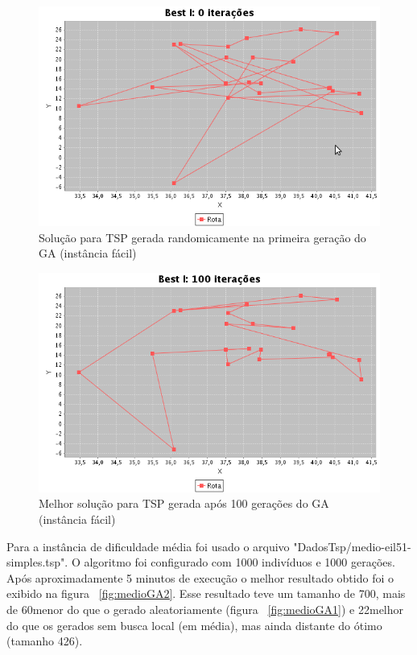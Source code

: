 \documentclass{acm_proc_article-sp}
\begin{document}
\begin{figure}[ht]
 \begin{center}
  \includegraphics[scale=0.4]{imagens/facil_GA1.png} 
  \caption{Solução para TSP gerada randomicamente na primeira geração do GA (instância fácil)}
  \label{fig:facilGA1}
 \end{center}
\end{figure}

\begin{figure}[ht]
 \begin{center}
  \includegraphics[scale=0.4]{imagens/facil_GA2.png} 
  \caption{Melhor solução para TSP gerada após 100 gerações do GA (instância fácil)}
  \label{fig:facilGA2}
 \end{center}
\end{figure}

Para a instância de dificuldade média foi usado o arquivo "DadosTsp/medio-eil51-simples.tsp".  O algoritmo foi configurado com 1000 indivíduos e 1000 gerações. Após aproximadamente 5 minutos  de execução o melhor resultado obtido foi o exibido na figura ~\ref{fig:medioGA2}. Esse resultado teve um tamanho de 700, mais de 60\textdiscount menor do que o gerado aleatoriamente (figura ~\ref{fig:medioGA1})  e 22\textdiscount melhor do que os gerados sem busca local (em média), mas ainda distante do ótimo (tamanho 426). 
\end{document}
